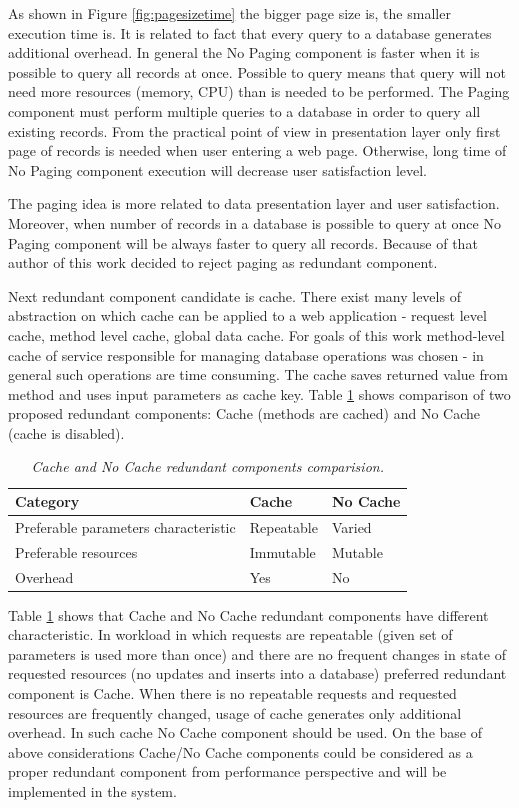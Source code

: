 \documentclass[10pt,a4paper]{article}
\begin{document}
As shown in Figure \ref{fig:pagesizetime} the bigger page size is, the smaller execution time is. It is related to fact that every query to a database generates additional overhead. 
In general the No Paging component is faster when it is possible to query all records at once. Possible to query means that query will not need more resources (memory, CPU) than is needed to be performed. 
The Paging component must perform multiple queries to a database in order to query all existing records. From the practical point of view in presentation layer only first page of records is needed when user entering a web page. Otherwise, long time of No Paging component execution will decrease user satisfaction level.  

The paging idea is more related to data presentation layer and user satisfaction. Moreover, when number of records in a database is possible to query at once No Paging component will be always faster to query all records. Because of that author of this work decided to reject paging as redundant component. 

Next redundant component candidate is cache. There exist many levels of abstraction on which cache can be applied to a web application - request level cache, method level cache, global data cache. For goals of this work method-level cache of service responsible for managing database operations was chosen - in general such operations are time consuming. The cache saves returned value from method and uses input parameters as cache key. Table \ref{cachecomponents} shows comparison of two proposed redundant components: Cache (methods are cached) and No Cache (cache is disabled).
\begin{table}[!htb]
\def\arraystretch{1.5}
\caption{\textit{Cache and No Cache redundant components comparision.}}\label{cachecomponents}
\begin{tabularx}{\textwidth}{p{3cm}|X|X}
  \textbf{Category} &\textbf{Cache} & \textbf{No Cache} \\
\hline
Preferable parameters characteristic & Repeatable & Varied \\
Preferable resources & Immutable & Mutable\\
Overhead & Yes & No\\
\end{tabularx}
\end{table}
 
Table \ref{cachecomponents} shows that Cache and No Cache redundant components have different characteristic. In workload in which requests are repeatable (given set of parameters is used more than once) and there are no frequent changes in state of requested resources (no updates and inserts into a database) preferred redundant component is Cache. When there is no repeatable requests and requested resources are frequently changed, usage of cache generates only additional overhead. In such cache No Cache component should be used. On the base of above considerations Cache/No Cache components could be considered as a proper redundant component from performance perspective and will be implemented in the system. 
\end{document}
